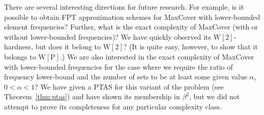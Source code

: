 \documentclass[11pt]{article}
\newcommand{\wtwo}{{\mathrm{W[2]}}}
\newcommand{\wpclass}{{\mathrm{W[P]}}}
\begin{document}
There are several interesting directions for future research. For
example, is it possible to obtain FPT approximation schemes for
MaxCover with lower-bounded element frequencies? Further, what is the
exact complexity of MaxCover (with or without lower-bounded
frequencies)? We have quickly observed its $\wtwo$-hardness, but does
it belong to $\wtwo$? (It is quite easy, however, to show that it
belongs to $\wpclass$.) We are also interested in the exact complexity
of MaxCover with lower-bounded frequencies for the case where we
require the ratio of frequency lower-bound and the number of sets to
be at least some given value $\alpha$, $0 < \alpha < 1$? We have given
a PTAS for this variant of the problem (see Theorem~\ref{thm:ptas})
and have shown its membership in $\beta^2$, but we did not attempt to
prove its completeness for any particular complexity class.
















\end{document}
